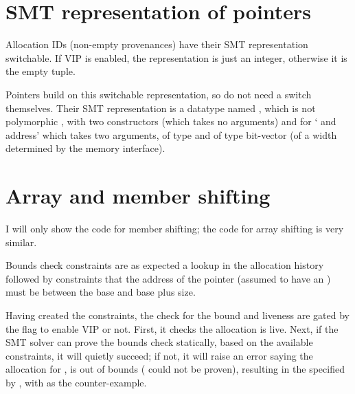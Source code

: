 
\section{SMT representation of pointers}

Allocation IDs (non-empty provenances) have their SMT representation
switchable. If VIP is enabled, the representation is just an integer, otherwise
it is the empty tuple.


Pointers build on this switchable representation, so do not need a switch
themselves. Their SMT representation is a datatype named
, which is not polymorphic \ocamlinline{[]}, with two %
constructors  (which takes no arguments) and
 for ` and address' which takes two arguments,
 of type  and %
 of type bit-vector (of a width determined by the memory %
interface).


\section{Array and member shifting}\label{sec:impl-array-member-shift}

I will only show the code for member shifting; the code for array shifting is
very similar.

Bounds check constraints are as expected \textemdash{} a lookup in the
allocation history followed by constraints that the address of the pointer
(assumed to have an ) must be between the base and base plus
size.


Having created the constraints, the check for the bound and liveness are gated
by the flag to enable VIP or not. First, it checks the allocation is live.
Next, if the SMT solver can prove the bounds check statically, based on the
available constraints, it will quietly succeed; if not, it will raise an error
saying the allocation for , is out of bounds
( could not be proven), resulting in the  specified
by , with  as the counter-example.

